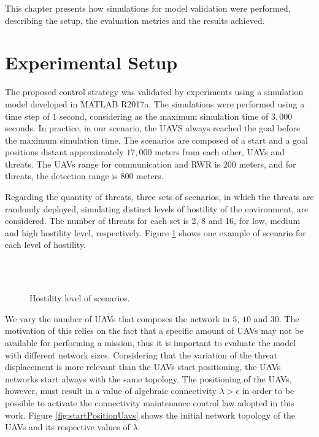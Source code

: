 This chapter presents how simulations for model validation were performed, describing the setup, the evaluation metrics and the results achieved. 

\section{Experimental Setup}

The proposed control strategy was validated by experiments using a simulation model developed in MATLAB\textsuperscript{\textregistered} R2017a. The simulations were performed using a time step of $1$ second, considering as the maximum simulation time of $3,000$ seconds. In practice, in our scenario, the UAVS always reached the goal before the maximum simulation time. The scenarios are composed of a start and a goal positions distant approximately $17,000$ meters from each other, UAVs and threats. The UAVs range for communication and RWR is $200$ meters, and for threats, the detection range is $800$ meters. 

Regarding the quantity of threats, three sets of scenarios, in which the threats are randomly deployed, simulating distinct levels of hostility of the environment, are considered. The number of threats for each set is 2, 8 and 16, for low, medium and high hostility level, respectively. Figure \ref{fig:hostilityLevel} shows one example of scenario for each level of hostility.

\begin{figure}[hbt!]
      \centering            
            \\ \centering
       \\ \centering
      \caption{Hostility level of scenarios.}
      \label{fig:hostilityLevel}
\end{figure}

We vary the number of UAVs that composes the network in $5$, $10$ and $30$. The motivation of this relies on the fact that a specific amount of UAVs may not be available for performing a mission, thus it is important to evaluate the model with different network sizes. Considering that the variation of the threat displacement is more relevant than the UAVs start positioning, the UAVs networks start always with the same topology. The positioning of the UAVs, however, must result in a value of algebraic connectivity $\lambda > \epsilon$ in order to be possible to activate the connectivity maintenance control law adopted in this work. Figure \ref{fig:startPositionUavs} shows the initial network topology of the UAVs and its respective values of $\lambda$.

